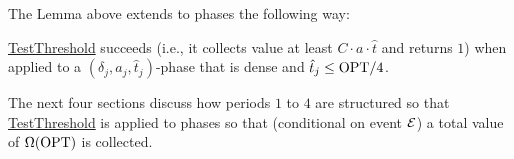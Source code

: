  The Lemma above extends to phases the following way:
 \begin{lemma}\label{lemma:phasesucc}
     \hyperref[alg:TestTHRESHOLD]{TestThreshold} succeeds (i.e., it collects value at least $C\cdot a \cdot \hat{t}$ and returns $1$) when applied to a $\left(\delta_j,a_j,\hat{t}_j\right)$-phase that is dense and $\hat{t}_j \le \mathrm{OPT} / 4$.
 \end{lemma}

The next four sections discuss how periods $1$ to $4$ are structured so that \hyperref[alg:TestTHRESHOLD]{TestThreshold} is applied to phases so that (conditional on event $\mathcal{E}$) a total value of $\Omega(\mathrm{OPT})$ is collected. 





